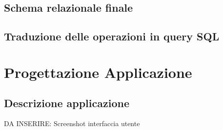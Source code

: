 \documentclass[a4paper,12pt]{report}
\begin{document}
\section{Schema relazionale finale}

\section{Traduzione delle operazioni in query SQL}

\chapter{Progettazione Applicazione}

\section{Descrizione applicazione}

DA INSERIRE: Screenshot interfaccia utente
\end{document}
